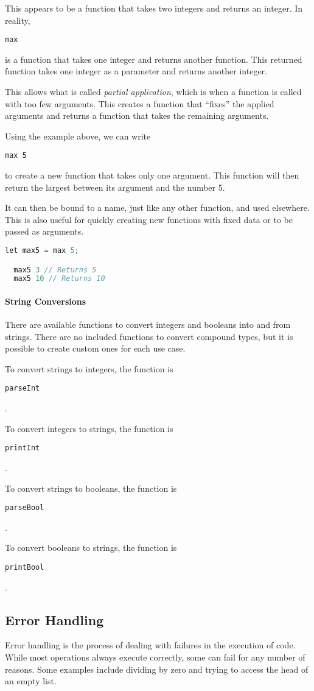 \documentclass{article}
\def\code#1{\begin{footnotesize}\texttt{#1}\end{footnotesize}}
\begin{document}
This appears to be a function that takes two integers and returns an integer.
In reality, \code{max} is a function that takes one integer and returns another function.
This returned function takes one integer as a parameter and returns another integer.

This allows what is called \emph{partial application}, which is when a function is called with too few arguments.
This creates a function that ``fixes'' the applied arguments and returns a function that takes the remaining arguments.

Using the example above, we can write \code{max 5} to create a new function that takes only one argument.
This function will then return the largest between its argument and the number 5.

It can then be bound to a name, just like any other function, and used elsewhere.
This is also useful for quickly creating new functions with fixed data or to be passed as arguments.

\begin{lstlisting}[language=V]
  let max5 = max 5;

  max5 3 // Returns 5
  max5 10 // Returns 10
\end{lstlisting}

\paragraph{String Conversions}

There are available functions to convert integers and booleans into and from strings.
There are no included functions to convert compound types, but it is possible to create custom ones for each use case.

To convert strings to integers, the function is \code{parseInt}.

To convert integers to strings, the function is \code{printInt}.

To convert strings to booleans, the function is \code{parseBool}.

To convert booleans to strings, the function is \code{printBool}.

\subsection{Error Handling}

Error handling is the process of dealing with failures in the execution of code.
While most operations always execute correctly, some can fail for any number of reasons.
Some examples include dividing by zero and trying to access the head of an empty list.
\end{document}
